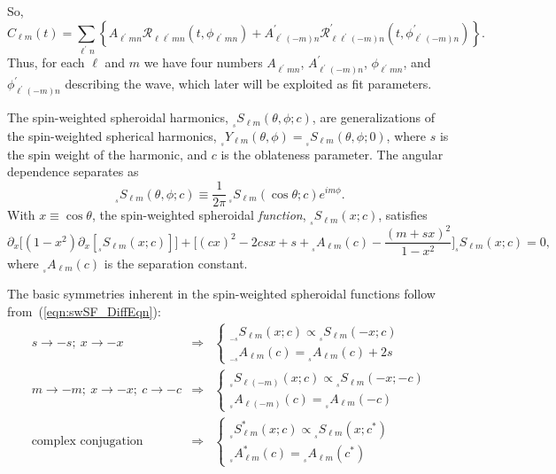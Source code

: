 \documentclass[11pt]{article}
\newcommand{\swY}[4][]{{}_{{}_{#2}}\!Y^{#1}_{#3}(#4)}
\newcommand{\swSH}[5][]{{}_{{}_{#2}}S^{#1}_{#3}(#4;#5)}
\newcommand{\swS}[5][]{{}_{{}_{#2}}S^{#1}_{#3}(#4;#5)}
\newcommand{\scA}[4][]{{}_{{}_{#2}}A^{#1}_{#3}(#4)}
\begin{document}
So,
\begin{equation}
 C_{\ell{m}}(t) = \sum_{\ell^\prime{n}} \left\{ 
   A_{\ell^\prime{m}n}\mathcal{R}_{\ell\ell^\prime{m}n}(t,\phi_{\ell^\prime{m}n})
  + A^\prime_{\ell^\prime(-m)n}
     \mathcal{R}^\prime_{\ell\ell^\prime(-m)n}(t,\phi^\prime_{\ell^\prime(-m)n})
     \right\}.
\end{equation}
Thus, for each $\ell$ and $m$ we have four numbers $A_{\ell^\prime{m}n}$, $A^\prime_{\ell^\prime(-m)n}$, $\phi_{\ell^\prime{m}n}$, and $\phi^\prime_{\ell^\prime(-m)n}$ describing the wave, which later will be exploited as fit parameters.

\newpage
{}
\vspace{0.25in}

The spin-weighted spheroidal harmonics,
$\swSH{s}{\ell{m}}{\theta,\phi}{c}$, are generalizations of the
spin-weighted spherical harmonics,
$\swY{s}{\ell{m}}{\theta,\phi}=\swSH{s}{\ell{m}}{\theta,\phi}{0}$,
where $s$ is the spin weight of the harmonic, and $c$ is the
oblateness parameter.  The angular dependence separates as
\begin{equation}
  \swSH{s}{\ell{m}}{\theta,\phi}{c} \equiv 
  \frac1{2\pi}\,\swS{s}{\ell{m}}{\cos\theta}{c}e^{im\phi}.
\end{equation}
With $x\equiv\cos\theta$, the spin-weighted spheroidal {\em function},
$\swS{s}{\ell{m}}{x}{c}$, satisfies
\begin{equation}\label{eqn:swSF_DiffEqn}
\partial_x \Big[ (1-x^2)\partial_x [\swS{s}{\ell{m}}{x}{c}]\Big] 
    + \bigg[(cx)^2 - 2 csx + s + \scA{s}{\ell m}{c} 
      - \frac{(m+sx)^2}{1-x^2}\bigg]\swS{s}{\ell{m}}{x}{c} = 0,
\end{equation}
where $\scA{s}{\ell m}{c}$ is the separation constant.

The basic symmetries inherent in the spin-weighted spheroidal functions
follow from~(\ref{eqn:swSF_DiffEqn}):
\begin{eqnarray}
s\rightarrow-s;\ x\rightarrow-x &\Rightarrow&
    \left\{\begin{array}{c}\swS{-s}{\ell{m}}{x}{c}\propto\swS{s}{\ell{m}}{-x}{c} \\
        \scA{-s}{\ell{m}}{c} = \scA{s}{\ell{m}}{c} + 2s \end{array}\right. \\
m\rightarrow-m;\ x\rightarrow-x;\ c\rightarrow-c &\Rightarrow&
    \left\{\begin{array}{c}\swS{s}{\ell(-m)}{x}{c}\propto\swS{s}{\ell{m}}{-x}{-c}\\
        \scA{s}{\ell(-m)}{c} = \scA{s}{\ell{m}}{-c} \end{array}\right. \\
\mbox{complex conjugation} &\Rightarrow&
    \left\{\begin{array}{c} \swS[*]{s}{\ell{m}}{x}{c}\propto\swS{s}{\ell{m}}{x}{c^*} \\
        \scA[*]{s}{\ell{m}}{c} = \scA{s}{\ell{m}}{c^*} \end{array}\right.
\end{eqnarray}
\end{document}
